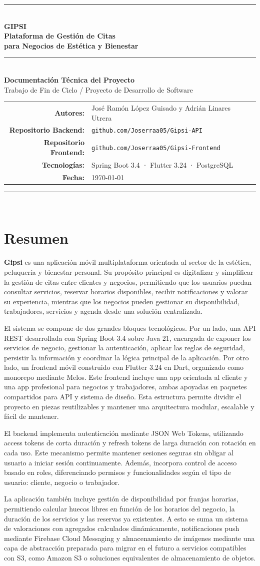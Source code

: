 \documentclass[12pt,a4paper,twoside]{report}
\newcommand{\portada}{%
  \begin{titlepage}
    \centering
    \vspace*{1.5cm}

    {\color{gipsiVerde}\rule{\linewidth}{2pt}}\\[0.5cm]

    {\Huge\bfseries\color{gipsiFondo} GIPSI}\\[0.3cm]
    {\Large\bfseries Plataforma de Gestión de Citas\\para Negocios de Estética y Bienestar}\\[0.3cm]

    {\color{gipsiVerde}\rule{\linewidth}{2pt}}\\[1.5cm]

    {\large\bfseries Documentación Técnica del Proyecto}\\[0.5cm]
    {\normalsize Trabajo de Fin de Ciclo / Proyecto de Desarrollo de Software}\\[2cm]

    \begin{tabular}{rl}
      \textbf{Autores:}      & José Ramón López Guisado y Adrián Linares Utrera\\[0.4em]
      \textbf{Repositorio Backend:}  & \texttt{github.com/Joserraa05/Gipsi-API} \\[0.3em]
      \textbf{Repositorio Frontend:} & \texttt{github.com/Joserraa05/Gipsi-Frontend} \\[0.4em]
      \textbf{Tecnologías:} & Spring Boot 3.4 · Flutter 3.24 · PostgreSQL \\[0.3em]
      \textbf{Fecha:}       & \today \\
    \end{tabular}

    \vfill

    {\color{gipsiVerde}\rule{\linewidth}{1pt}}\\[0.3cm]
  \end{titlepage}
}
\begin{document}
\portada

\chapter*{Resumen}

\textbf{Gipsi} es una aplicación móvil multiplataforma orientada al sector de la estética,
peluquería y bienestar personal. Su propósito principal es digitalizar y simplificar
la gestión de citas entre clientes y negocios, permitiendo que los usuarios puedan
consultar servicios, reservar horarios disponibles, recibir notificaciones y valorar
su experiencia, mientras que los negocios pueden gestionar su disponibilidad,
trabajadores, servicios y agenda desde una solución centralizada.

El sistema se compone de dos grandes bloques tecnológicos. Por un lado, una
API REST desarrollada con Spring Boot 3.4 sobre Java 21, encargada de exponer
los servicios de negocio, gestionar la autenticación, aplicar las reglas de seguridad,
persistir la información y coordinar la lógica principal de la aplicación. Por otro
lado, un frontend móvil construido con Flutter 3.24 en Dart, organizado como
monorepo mediante Melos. Este frontend incluye una app orientada al cliente y
una app profesional para negocios y trabajadores, ambas apoyadas en paquetes
compartidos para API y sistema de diseño. Esta estructura permite dividir el
proyecto en piezas reutilizables y mantener una arquitectura modular, escalable
y fácil de mantener.

El backend implementa autenticación mediante JSON Web Tokens, utilizando
access tokens de corta duración y refresh tokens de larga duración con rotación
en cada uso. Este mecanismo permite mantener sesiones seguras sin obligar al
usuario a iniciar sesión continuamente. Además, incorpora control de acceso basado
en roles, diferenciando permisos y funcionalidades según el tipo de usuario:
cliente, negocio o trabajador.

La aplicación también incluye gestión de disponibilidad por franjas horarias,
permitiendo calcular huecos libres en función de los horarios del negocio, la duración
de los servicios y las reservas ya existentes. A esto se suma un sistema de valoraciones
con agregados calculados dinámicamente, notificaciones push mediante Firebase Cloud
Messaging y almacenamiento de imágenes mediante una capa de abstracción preparada
para migrar en el futuro a servicios compatibles con S3, como Amazon S3 o soluciones
equivalentes de almacenamiento de objetos.
\end{document}
